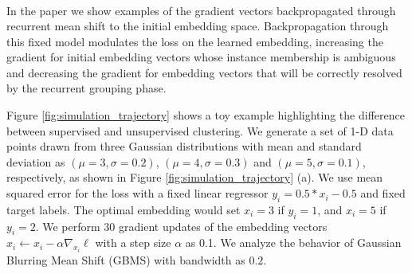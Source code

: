 \documentclass[10pt,twocolumn,letterpaper]{article}
\def\x{{\bf x}}
\def\RB{{\mathbb R}}
\begin{document}
\begin{equation}
\begin{split}
{}
\end{split}
\end{equation}%
In the paper we show examples of the gradient vectors backpropagated through
recurrent mean shift to the initial embedding space. Backpropagation through
this fixed model modulates the loss on the learned embedding, increasing the
gradient for initial embedding vectors whose instance membership is ambiguous
and decreasing the gradient for embedding vectors that will be correctly
resolved by the recurrent grouping phase.

Figure \ref{fig:simulation_trajectory} shows a toy example highlighting the difference
between supervised and unsupervised clustering.  We generate  a set of 1-D data
points drawn from three Gaussian distributions with mean and standard deviation
as $(\mu=3, \sigma=0.2)$, $(\mu=4, \sigma=0.3)$ and $(\mu=5, \sigma=0.1)$,
respectively, as shown in Figure \ref{fig:simulation_trajectory} (a).
We use mean squared error for the loss with a fixed linear
regressor $y_i = 0.5*x_i-0.5$ and fixed target labels. The optimal embedding
would set $x_i=3$ if $y_i=1$, and $x_i=5$ if $y_i=2$. We perform 30 gradient
updates of the embedding vectors $x_i \leftarrow x_i - \alpha \nabla_{x_i}
\ell$ with a step size $\alpha$ as 0.1.
We analyze the behavior of Gaussian Blurring Mean Shift (GBMS) with bandwidth as $0.2$.
\end{document}
